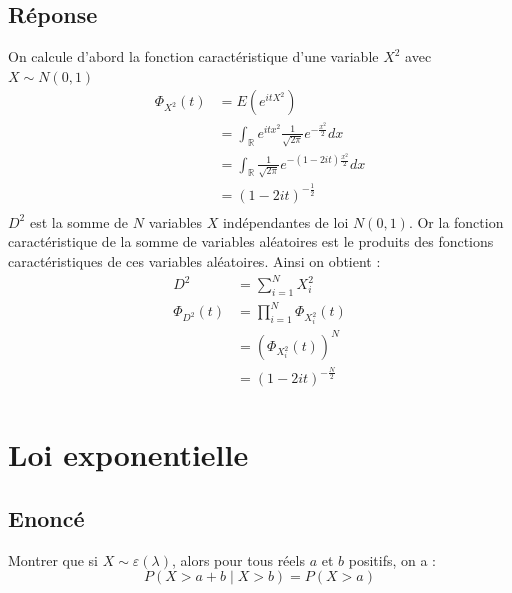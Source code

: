 \documentclass[10pt,a4paper,twoside]{article}
\begin{document}
\subsection*{Réponse}
On calcule d'abord la fonction caractéristique d'une variable $X^{2}$ avec $X\sim N(0,1)$
\begin{align*}
\Phi_{X^{2}}(t) &= E\left(e^{itX^{2}}\right)\\
&= \int_{\mathbb{R}} e^{itx^{2}} \frac{1}{\sqrt{2\pi}} e^{-\frac{x^{2}}{2}} dx \\
&= \int_{\mathbb{R}} \frac{1}{\sqrt{2\pi}} e^{-(1-2it)\frac{x^{2}}{2}} dx\\
&= (1-2it)^{-\frac{1}{2}}\\
\end{align*}
$D^{2}$ est la somme de $N$ variables $X$ indépendantes de loi $N(0,1)$. Or la fonction caractéristique de la somme de variables aléatoires est le produits des fonctions caractéristiques de ces variables aléatoires. Ainsi on obtient :
\begin{align*}
D^{2} &= \sum_{i=1}^{N} X_{i}^{2}\\
\Phi_{D^{2}}(t) &= \prod_{i=1}^{N} \Phi_{X_{i}^{2}}(t) \\
 & = (\Phi_{X_{i}^{2}}(t))^{N} \\
 & = (1-2it)^{-\frac{N}{2}}\\
\end{align*}


\section{Loi exponentielle}
\subsection*{Enoncé}
Montrer que si $X\sim \varepsilon(\lambda)$, alors pour tous réels $a$ et $b$ positifs, on a :
\[ P(X>a+b \mid X>b) = P(X>a) \]
\end{document}
